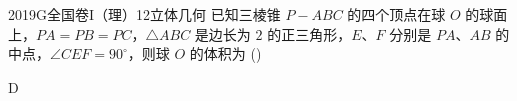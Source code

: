 
\begin{problem}{2019}{G}{全国卷I（理）}{12}{立体几何}
已知三棱锥 $ P-ABC $ 的四个顶点在球 $ O $ 的球面上，$ PA=PB=PC $，$ \triangle ABC $ 是边长为 $ 2 $ 的正三角形，$ E $、$ F $ 分别是 $ PA $、$ AB $ 的中点，$ \angle CEF=90^\circ $，则球 $ O $ 的体积为 (\hspace{1cm})
\begin{choices}
\end{choices}
\end{problem}

\begin{answer}
D
\end{answer}

\begin{solutions}


\end{solutions}